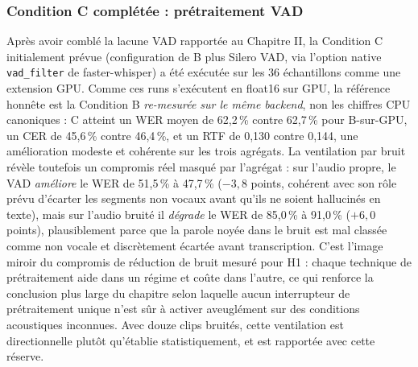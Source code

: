 \documentclass[12pt]{report}
\begin{document}
\subsubsection{Condition C complétée : prétraitement VAD}
Après avoir comblé la lacune VAD rapportée au Chapitre II, la Condition C initialement prévue (configuration de B plus Silero VAD, via l'option native \texttt{vad\_filter} de faster-whisper) a été exécutée sur les 36 échantillons comme une extension GPU. Comme ces runs s'exécutent en float16 sur GPU, la référence honnête est la Condition B \emph{re-mesurée sur le même backend}, non les chiffres CPU canoniques : C atteint un WER moyen de 62,2\,\% contre 62,7\,\% pour B-sur-GPU, un CER de 45,6\,\% contre 46,4\,\%, et un RTF de 0,130 contre 0,144, une amélioration modeste et cohérente sur les trois agrégats. La ventilation par bruit révèle toutefois un compromis réel masqué par l'agrégat : sur l'audio propre, le VAD \emph{améliore} le WER de 51,5\,\% à 47,7\,\% ($-3{,}8$ points, cohérent avec son rôle prévu d'écarter les segments non vocaux avant qu'ils ne soient hallucinés en texte), mais sur l'audio bruité il \emph{dégrade} le WER de 85,0\,\% à 91,0\,\% ($+6{,}0$ points), plausiblement parce que la parole noyée dans le bruit est mal classée comme non vocale et discrètement écartée avant transcription. C'est l'image miroir du compromis de réduction de bruit mesuré pour H1 : chaque technique de prétraitement aide dans un régime et coûte dans l'autre, ce qui renforce la conclusion plus large du chapitre selon laquelle aucun interrupteur de prétraitement unique n'est sûr à activer aveuglément sur des conditions acoustiques inconnues. Avec douze clips bruités, cette ventilation est directionnelle plutôt qu'établie statistiquement, et est rapportée avec cette réserve.
\end{document}
